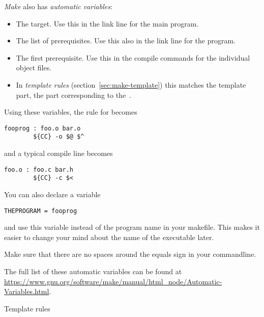 \emph{Make} also has \emph{automatic variables}:
\begin{itemize}
\item [\n{\$@}] The target. Use this in the link line for the main
  program. %
\item [\n{\$\char`\^}] The list of prerequisites. Use this also in the link
  line for the program.
\item [\n{\$<}] The first prerequisite. Use this in the compile
  commands for the individual object files.
\item [\n{\$*}] In \emph{template rules}
  (section~\ref{sec:make-template}) this matches the template part,
  the part corresponding to the~.
\end{itemize}
Using these variables, the rule for  becomes
\begin{verbatim}
fooprog : foo.o bar.o
        ${CC} -o $@ $^
\end{verbatim}
and a typical compile line becomes
\begin{verbatim}
foo.o : foo.c bar.h
        ${CC} -c $<
\end{verbatim}

You can also declare a variable
\begin{verbatim}
THEPROGRAM = fooprog
\end{verbatim}
and use this variable instead of the program name in your
makefile. This makes it easier to change your mind about the name of
the executable later. 

  {Make sure that there are no spaces
  around the equals sign in your commandline.}

The full list of these automatic variables can be found at
\url{https://www.gnu.org/software/make/manual/html_node/Automatic-Variables.html}.

 {Template rules}
\label{sec:make-template}

